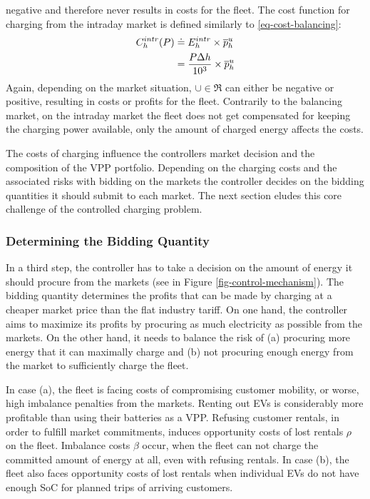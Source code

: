\documentclass[a4paper, 12pt]{article}
\begin{document}
negative and therefore never results in costs for the fleet. The cost function
for charging from the intraday market is defined similarly to
\eqref{eq-cost-balancing}:
\begin{equation}
\begin{split}
    C^{intr}_{h}(P) &\doteq E^{intr}_{h} \times \overline p^u_{h} \\
    &= \frac{P\Delta h}{10^{3}}\times \overline p^u_{h}
\end{split}
\end{equation}
Again, depending on the market situation, \(\cup{}\!\in\!\Re\) can either be
negative or positive, resulting in costs or profits for the fleet. Contrarily to
the balancing market, on the intraday market the fleet does not get compensated
for keeping the charging power available, only the amount of charged energy affects the
costs.

The costs of charging influence the controllers market decision and the
composition of the VPP portfolio. Depending on the charging costs and the
associated risks with bidding on the markets the controller decides on the
bidding quantities it should submit to each market. The next section eludes this
core challenge of the controlled charging problem.

\subsubsection{Determining the Bidding Quantity}
\label{sec:org73db9dc}
In a third step, the controller has to take a decision on the amount of energy
it should procure from the markets (see in Figure
\ref{fig-control-mechanism}). The bidding quantity determines the profits that can
be made by charging at a cheaper market price than the flat industry tariff. On
one hand, the controller aims to maximize its profits by procuring as much
electricity as possible from the markets. On the other hand, it needs to balance
the risk of (a) procuring more energy that it can maximally charge and (b) not
procuring enough energy from the market to sufficiently charge the fleet.

In case (a), the fleet is facing costs of compromising customer mobility, or
worse, high imbalance penalties from the markets. Renting out EVs is
considerably more profitable than using their batteries as a VPP. Refusing
customer rentals, in order to fulfill market commitments, induces opportunity
costs of lost rentals \(\rho\) on the fleet. Imbalance costs \(\beta\) occur, when
the fleet can not charge the committed amount of energy at all, even with refusing
rentals. In case (b), the fleet also faces opportunity costs of lost rentals
when individual EVs do not have enough SoC for planned trips of arriving
customers.
\end{document}
